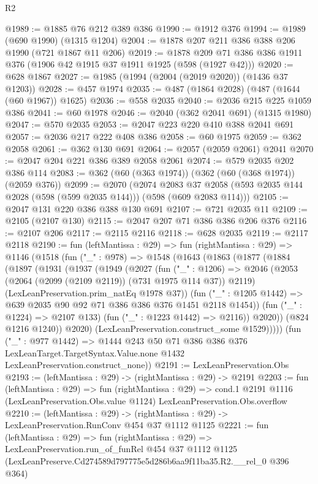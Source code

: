 \begin{lexlean}{R2}
\begin{coremodule}
@1989 := @1885 @76 @212 @389 @386
@1990 := @1912 @376
@1994 := @1989 (@690 @1990) (@1315 @1204)
@2004 := @1878 @207 @211 @386 @388 @206 @1990 (@721 @1867 @11 @206)
@2019 := @1878 @209 @71 @386 @386 @1911 @376 (@1906 @42 @1915 @37 @1911 @1925 (@598 (@1927 @42)))
@2020 := @628 @1867
@2027 := @1985 (@1994 (@2004 (@2019 @2020)) (@1436 @37 @1203))
@2028 := @457 @1974
@2035 := @487 (@1864 @2028) (@487 (@1644 (@60 @1967)) @1625)
@2036 := @558 @2035
@2040 := @2036 @215 @225 @1059 @386
@2041 := @60 @1978
@2046 := @2040 (@362 @2041 @691) (@1315 @1980)
@2047 := @570 @2035
@2053 := @2047 @223 @220 @410 @388 @2041 @691
@2057 := @2036 @217 @222 @408 @386
@2058 := @60 @1975
@2059 := @362 @2058
@2061 := @362 @130 @691
@2064 := @2057 (@2059 @2061) @2041
@2070 := @2047 @204 @221 @386 @389 @2058 @2061
@2074 := @579 @2035 @202 @386 @114
@2083 := @362 (@60 (@363 @1974)) (@362 (@60 (@368 @1974)) (@2059 @376))
@2099 := @2070
    (@2074
      @2083
      @37
      @2058
      (@593 @2035 @144 @2028 (@598 (@599 @2035 @144)))
      (@598 (@609 @2083 @114)))
@2105 := @2047 @131 @220 @386 @388 @130 @691
@2107 := @721 @2035 @11
@2109 := @2105 (@2107 @130)
@2115 := @2047 @207 @71 @386 @386 @206 @376
@2116 := @2107 @206
@2117 := @2115 @2116
@2118 := @628 @2035
@2119 := @2117 @2118
@2190 := fun (leftMantissa : @29) =>
  fun (rightMantissa : @29) =>
  @1146
    (@1518
      (fun ("_" : @978) =>
      @1548
        (@1643
          (@1863
            (@1877
              (@1884
                (@1897
                  (@1931
                    (@1937
                      (@1949
                        (@2027
                          (fun ("_" : @1206) =>
                          @2046
                            (@2053 (@2064 (@2099 (@2109 @2119)) (@731 @1975 @114 @37)) @2119)
                            (LexLeanPreservation.prim_natEq @1978 @37))
                          (fun ("_" : @1205 @1442) =>
                          @639 @2035 @90 @92 @71 @386 @386 @376 @1451 @2118 @1454))
                        (fun ("_" : @1224) => @2107 @133)
                        (fun ("_" : @1223 @1442) => @2116))
                      @2020))
                  (@824 @1216 @1240))
                @2020)
              (LexLeanPreservation.construct_some @1529)))))
      (fun ("_" : @977 @1442) =>
      @1444
        @243
        @50
        @71
        @386
        @386
        @376
        LexLeanTarget.TargetSyntax.Value.none
        @1432
        LexLeanPreservation.construct_none))
@2191 := LexLeanPreservation.Obs
@2193 := (leftMantissa : @29) -> (rightMantissa : @29) -> @2191
@2203 := fun (leftMantissa : @29) =>
  fun (rightMantissa : @29) =>
  cond.{1} @2191 @1116 (LexLeanPreservation.Obs.value @1124) LexLeanPreservation.Obs.overflow
@2210 := (leftMantissa : @29) ->
  (rightMantissa : @29) -> LexLeanPreservation.RunConv @454 @37 @1112 @1125
@2221 := fun (leftMantissa : @29) =>
  fun (rightMantissa : @29) =>
  LexLeanPreservation.run_of_funRel
    @454
    @37
    @1112
    @1125
    (LexLeanPreserve.Cd274589d797775e5d286b6aa9f11ba35.R2.__rel_0 @396 @364)
\end{coremodule}
\end{lexlean}
